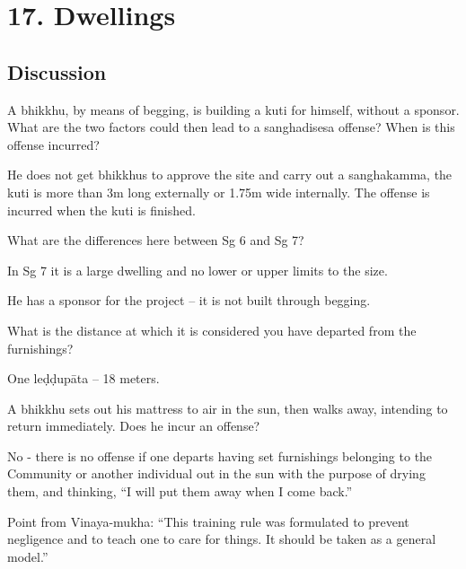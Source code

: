 \chapter{17. Dwellings}
\renewcommand*{\theChapterTitle}{17. Dwellings}

\section*{Discussion}


A bhikkhu, by means of begging, is building a kuti for himself, without a
sponsor. What are the two factors could then lead to a sanghadisesa offense?
When is this offense incurred?

\begin{solution}
  He does not get bhikkhus to approve the site and carry out a sanghakamma, the
  kuti is more than 3m long externally or 1.75m wide internally. The offense is
  incurred when the kuti is finished.
\end{solution}

\bigskip


What are the differences here between Sg 6 and Sg 7?

\begin{solution}
  In Sg 7 it is a large dwelling and no lower or upper limits to the size.

  He has a sponsor for the project – it is not built through begging. 
\end{solution}

\bigskip


What is the distance at which it is considered you have departed from the furnishings?

\begin{solution}
  One leḍḍupāta -- 18 meters.
\end{solution}

\bigskip

A bhikkhu sets out his mattress to air in the sun, then walks away,
intending to return immediately. Does he incur an offense?

\begin{solution}
  No - there is no offense if one departs having set furnishings belonging to
  the Community or another individual out in the sun with the purpose of drying
  them, and thinking, “I will put them away when I come back.”

  Point from Vinaya-mukha: “This training rule was formulated to prevent
  negligence and to teach one to care for things. It should be taken as a
  general model.”
\end{solution}

